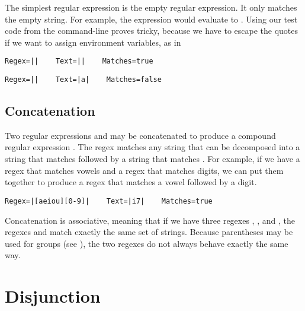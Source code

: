 The simplest regular expression is the empty regular expression.  It
only matches the empty string.  For example, the expression
 would evaluate to
.  Using our test code from the command-line proves tricky,
because we have to escape the quotes if we want to assign environment
variables, as in 
%
\begin{verbatim}
Regex=||    Text=||    Matches=true
\end{verbatim}
%
\begin{verbatim}
Regex=||    Text=|a|    Matches=false
\end{verbatim}


\subsection{Concatenation}

Two regular expressions  and  may be
concatenated to produce a compound regular expression .
The regex  matches any string that can be decomposed into
a string that matches  followed by a string that matches
.  For example, if we have a regex \code{[aeiou]} that
matches vowels and a regex  that matches digits, we can put
them together to produce a regex that matches a vowel followed by a
digit.
%
\begin{verbatim}
Regex=|[aeiou][0-9]|    Text=|i7|    Matches=true
\end{verbatim}

Concatenation is associative, meaning that if we have three regexes
, , and , the regexes
 and
 match exactly the same set
of strings.  Because parentheses may be used for groups (see
), the two regexes do not always behave exactly
the same way.  


\section{Disjunction}

